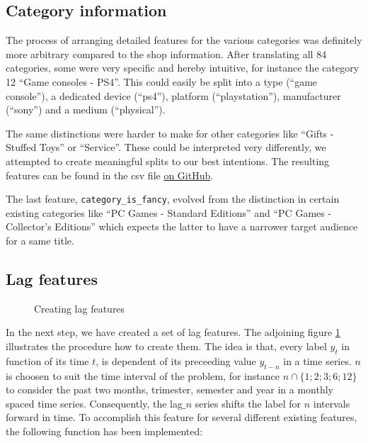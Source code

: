 \subsection{Category information}

The process of arranging detailed features for the various categories was definitely more arbitrary compared to the shop information. After translating all 84 categories, some were very specific and hereby intuitive, for instance the category 12 \enquote{Game consoles - PS4}. This could easily be split into a type (\enquote{game console}), a dedicated device (\enquote{ps4}), platform (\enquote{playstation}), manufacturer (\enquote{sony}) and a medium (\enquote{physical}).

The same distinctions were harder to make for other categories like \enquote{Gifts - Stuffed Toys} or \enquote{Service}. These could be interpreted very differently, we attempted to create meaningful splits to our best intentions. The resulting features can be found in the \acrshort{csv} file \href{\repoblobbaseurl\finalCommit/data/feature_engineering/cities.csv}{on GitHub}.

The last feature, \texttt{category\_is\_fancy}, evolved from the distinction in certain existing categories like \enquote{PC Games - Standard Editions} and \enquote{PC Games - Collector's Editions} which expects the latter to have a narrower target audience for a same title.

\subsection{Lag features}

\begin{wrapfigure}[8]{l}{0.48\textwidth}
\centering

\captionsetup{justification=centering}
\caption{Creating lag features}
\label{lag}
\end{wrapfigure}


In the next step, we have created a set of lag features. The adjoining figure \ref{lag} illustrates the procedure how to create them. The idea is that, every label $y_t$ in function of its time $t$, is dependent of its preceeding value $y_{t-n}$ in a time series. $n$ is choosen to suit the time interval of the problem, for instance $n \cap \{1;2;3;6;12\}$ to consider the past two months, trimester, semester and year in a monthly spaced time series. Consequently, the lag$\_n$ series shifts the label for $n$ intervals forward in time. To accomplish this feature for several different existing features, the following function has been implemented:

